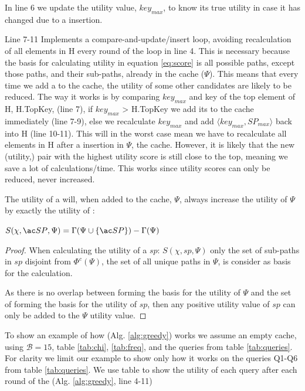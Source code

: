 In line 6 we update the utility value, $key_{max}$, to know its true utility in case it has changed due to a \spath insertion.

Line 7-11 Implements a compare-and-update/insert loop, avoiding recalculation of all elements in H every round of the loop in line 4. This is necessary because the basis for calculating utility in equation \ref{eq:score} is all possible paths, except those paths, and their sub-paths, already in the cache ($\Psi$). This means that every time we add a \spath to the cache, the utility of some other candidates are likely to be reduced. The way it works is by comparing $key_{max}$ and key of the top element of H, H.TopKey, (line 7), if $key_{max}$ >  H.TopKey we add its \spath to the cache immediately (line 7-9), else we recalculate $key_{max}$ and add $\langle  key_{max},  SP_{max} \rangle$ back into H (line 10-11). This will in the worst case mean we have to recalculate all elements in H after a \spath insertion in $\Psi$, the cache. However, it is likely that the new (utility,\spath) pair with the highest utility score is still close to the top, meaning we save a lot of calculations/time. This works since utility scores can only be reduced, never increased.


\begin{lemma}\label{lem:addutil}
The utility of a \spath will, when added to the cache, $\Psi$, always increase the utility of $\Psi$ by exactly the utility of \spathns:

$S(\chi, \spath, \Psi) = \Gamma(\Psi \cup \{\spath\}) - \Gamma(\Psi)$

\end{lemma}

\begin{proof}

When calculating the utility of a \spath $sp$: $S(\chi, sp, \Psi)$ only the set of sub-paths in $sp$ disjoint from $\Phi^c(\Psi)$, the set of all unique paths in $\Psi$, is consider as basis for the calculation. 

As there is no overlap between \spaths forming the basis for the utility of $\Psi$ and the set of \spaths forming the basis for the utility of $sp$, then any positive utility value of $sp$ can only be added to the $\Psi$ utility value. 
\end{proof}


To show an example of how \salgo (Alg. \ref{alg:greedy}) works we assume an empty cache, using $\mathcal{B}=15$, table \ref{tab:chi}, \ref{tab:freq}, and the queries from table \ref{tab:queries}. For clarity we limit our example to show only how it works on the queries Q1-Q6 from table \ref{tab:queries}. We use table \label{tab:steputil} to show the utility of each query after each round of the \salgo (Alg. \ref{alg:greedy}, line 4-11)

